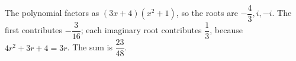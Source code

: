 The polynomial factors as $(3x+4)(x^2+1)$, so the roots are $- \dfrac{4}{3} , i , - i$. The first contributes $- \dfrac{3}{16}$; each imaginary root contributes $\dfrac{1}{3}$, because $4r^2+3r+4=3r$. The sum is $\boxed{\dfrac{23}{48}}$.
